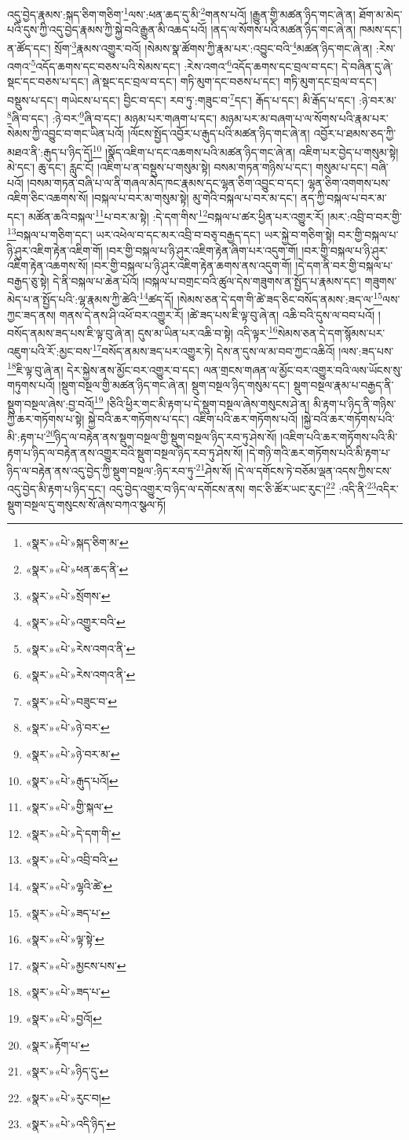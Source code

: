 འདུ་བྱེད་རྣམས་:སྐད་ཅིག་གཅིག་\footnote{«སྣར་»«པེ་»སྐད་ཅིག་མ་}ལས་:ཕན་ཆད་དུ་མི་\footnote{«སྣར་»«པེ་»ཕན་ཆད་ནི་}གནས་པའོ། །རྒྱུན་གྱི་མཚན་ཉིད་གང་ཞེ་ན། ཐོག་མ་མེད་པའི་དུས་ཀྱི་འདུ་བྱེད་རྣམས་ཀྱི་སྐྱེ་བའི་རྒྱུན་མི་འཆད་པའོ། །ནད་ལ་སོགས་པའི་མཚན་ཉིད་གང་ཞེ་ན། ཁམས་དང་། ན་ཚོད་དང་། སྲོག་\footnote{«སྣར་»«པེ་»སྲོགས་}རྣམས་འགྱུར་བའོ། །སེམས་སྣ་ཚོགས་ཀྱི་རྣམ་པར་:འབྱུང་བའི་\footnote{«སྣར་»«པེ་»འགྱུར་བའི་}མཚན་ཉིད་གང་ཞེ་ན། :རེས་འགའ་\footnote{«སྣར་»«པེ་»རེས་འགའ་ནི་}འདོད་ཆགས་དང་བཅས་པའི་སེམས་དང་། :རེས་འགའ་\footnote{«སྣར་»«པེ་»རེས་འགའ་ནི་}འདོད་ཆགས་དང་བྲལ་བ་དང་། དེ་བཞིན་དུ་ཞེ་སྡང་དང་བཅས་པ་དང་། ཞེ་སྡང་དང་བྲལ་བ་དང་། གཏི་མུག་དང་བཅས་པ་དང་། གཏི་མུག་དང་བྲལ་བ་དང་། བསྡུས་པ་དང་། གཡེངས་པ་དང་། བྱིང་བ་དང་། རབ་ཏུ་:གཟུང་བ་\footnote{«སྣར་»«པེ་»བཟུང་བ་}དང་། རྒོད་པ་དང་། མི་རྒོད་པ་དང་། :ཉེ་བར་མ་\footnote{«སྣར་»«པེ་»ཉེ་བར་}ཞི་བ་དང་། :ཉེ་བར་\footnote{«སྣར་»«པེ་»ཉེ་བར་མ་}ཞི་བ་དང་། མཉམ་པར་གཞག་པ་དང་། མཉམ་པར་མ་བཞག་པ་ལ་སོགས་པའི་རྣམ་པར་སེམས་ཀྱི་འབྱུང་བ་གང་ཡིན་པའོ། །ལོངས་སྤྱོད་འབྱོར་པ་རྒུད་པའི་མཚན་ཉིད་གང་ཞེ་ན། འབྱོར་པ་ཐམས་ཅད་ཀྱི་མཐའ་ནི་:རྒུད་པ་ཉིད་དོ།\footnote{«སྣར་»«པེ་»རྒུད་པའོ།} །སྣོད་འཇིག་པ་དང་འཆགས་པའི་མཚན་ཉིད་གང་ཞེ་ན། འཇིག་པར་བྱེད་པ་གསུམ་སྟེ། མེ་དང་། ཆུ་དང་། རླུང་ངོ། །འཇིག་པ་ན་བསྡུས་པ་གསུམ་སྟེ། བསམ་གཏན་གཉིས་པ་དང་། གསུམ་པ་དང་། བཞི་པའོ། །བསམ་གཏན་བཞི་པ་ལ་ནི་གཞལ་མེད་ཁང་རྣམས་དང་ལྷན་ཅིག་འབྱུང་བ་དང་། ལྷན་ཅིག་འགགས་པས་འཇིག་ཅིང་འཆགས་སོ། །བསྐལ་པ་བར་མ་གསུམ་སྟེ། མུ་གེའི་བསྐལ་པ་བར་མ་དང་། ནད་ཀྱི་བསྐལ་པ་བར་མ་དང་། མཚོན་ཆའི་བསྐལ་\footnote{«སྣར་»«པེ་»གྱི་སྐལ་}པ་བར་མ་སྟེ། :དེ་དག་གིས་\footnote{«སྣར་»«པེ་»དེ་དག་གི་}བསྐལ་པ་ཚར་ཕྱིན་པར་འགྱུར་རོ། །མར་:འབྲི་བ་བར་གྱི་\footnote{«སྣར་»«པེ་»འབྲི་བའི་}བསྐལ་པ་གཅིག་དང་། ཡར་འཕེལ་བ་དང་མར་འབྲི་བ་བཅྭ་བརྒྱད་དང་། ཡར་སྐྱེ་བ་གཅིག་སྟེ། བར་གྱི་བསྐལ་པ་ཉི་ཤུར་འཇིག་རྟེན་འཇིག་གོ། །བར་གྱི་བསྐལ་པ་ཉི་ཤུར་འཇིག་རྟེན་ཞིག་པར་འདུག་གོ། །བར་གྱི་བསྐལ་པ་ཉི་ཤུར་འཇིག་རྟེན་འཆགས་སོ། །བར་གྱི་བསྐལ་པ་ཉི་ཤུར་འཇིག་རྟེན་ཆགས་ནས་འདུག་གོ། །དེ་དག་ནི་བར་གྱི་བསྐལ་པ་བརྒྱད་ཅུ་སྟེ། དེ་ནི་བསྐལ་པ་ཆེན་པོའོ། །བསྐལ་པ་བགྲང་བའི་ཚུལ་དེས་གཟུགས་ན་སྤྱོད་པ་རྣམས་དང་། གཟུགས་མེད་པ་ན་སྤྱོད་པའི་:ལྷ་རྣམས་ཀྱི་ཚེའི་\footnote{«སྣར་»«པེ་»ལྷའི་ཚེ་}ཚད་དོ། །སེམས་ཅན་དེ་དག་གི་ཚེ་ཟད་ཅིང་བསོད་ནམས་:ཟད་ལ་\footnote{«སྣར་»«པེ་»ཟད་པ་}ལས་ཀྱང་ཟད་ནས། གནས་དེ་ནས་ཤི་འཕོ་བར་འགྱུར་རོ། །ཚེ་ཟད་པས་ཇི་ལྟ་བུ་ཞེ་ན། འཆི་བའི་དུས་ལ་བབ་པའོ། །བསོད་ནམས་ཟད་པས་ཇི་ལྟ་བུ་ཞེ་ན། དུས་མ་ཡིན་པར་འཆི་བ་སྟེ། འདི་ལྟར་\footnote{«སྣར་»«པེ་»ལྟ་སྟེ་}སེམས་ཅན་དེ་དག་སྙོམས་པར་འཇུག་པའི་རོ་:མྱང་བས་\footnote{«སྣར་»«པེ་»མྱངས་པས་}བསོད་ནམས་ཟད་པར་འགྱུར་ཏེ། དེས་ན་དུས་ལ་མ་བབ་ཀྱང་འཆིའོ། །ལས་:ཟད་པས་\footnote{«སྣར་»«པེ་»ཟད་པ་}ཇི་ལྟ་བུ་ཞེ་ན། དེར་སྐྱེས་ནས་མྱོང་བར་འགྱུར་བ་དང་། ལན་གྲངས་གཞན་ལ་མྱོང་བར་འགྱུར་བའི་ལས་ཡོངས་སུ་གཏུགས་པའོ། །སྡུག་བསྔལ་གྱི་མཚན་ཉིད་གང་ཞེ་ན། སྡུག་བསྔལ་ཉིད་གསུམ་དང་། སྡུག་བསྔལ་རྣམ་པ་བརྒྱད་ནི་སྡུག་བསྔལ་ཞེས་:བྱ་བའོ།\footnote{«སྣར་»«པེ་»བྱའོ།} །ཅིའི་ཕྱིར་གང་མི་རྟག་པ་དེ་སྡུག་བསྔལ་ཞེས་གསུངས་ཤེ་ན། མི་རྟག་པ་ཉིད་ནི་གཉིས་ཀྱི་ཆར་གཏོགས་པ་སྟེ། སྐྱེ་བའི་ཆར་གཏོགས་པ་དང་། འཇིག་པའི་ཆར་གཏོགས་པའོ། །སྐྱེ་བའི་ཆར་གཏོགས་པའི་མི་:རྟག་པ་\footnote{«སྣར་»རྟོག་པ་}ཉིད་ལ་བརྟེན་ནས་སྡུག་བསྔལ་གྱི་སྡུག་བསྔལ་ཉིད་རབ་ཏུ་ཤེས་སོ། །འཇིག་པའི་ཆར་གཏོགས་པའི་མི་རྟག་པ་ཉིད་ལ་བརྟེན་ནས་འགྱུར་བའི་སྡུག་བསྔལ་ཉིད་རབ་ཏུ་ཤེས་སོ། །དེ་གཉི་གའི་ཆར་གཏོགས་པའི་མི་རྟག་པ་ཉིད་ལ་བརྟེན་ནས་འདུ་བྱེད་ཀྱི་སྡུག་བསྔལ་:ཉིད་རབ་ཏུ་\footnote{«སྣར་»«པེ་»ཉིད་དུ་}ཤེས་སོ། །དེ་ལ་དགོངས་ཏེ་བཅོམ་ལྡན་འདས་ཀྱིས་ངས་འདུ་བྱེད་མི་རྟག་པ་ཉིད་དང་། འདུ་བྱེད་འགྱུར་བ་ཉིད་ལ་དགོངས་ནས། གང་ཅི་ཚོར་ཡང་རུང་།\footnote{«སྣར་»«པེ་»རུང་བ།} :འདི་ནི་\footnote{«སྣར་»«པེ་»འདི་ཉིད་}འདིར་སྡུག་བསྔལ་དུ་གསུངས་སོ་ཞེས་བཀའ་སྩལ་ཏོ། 